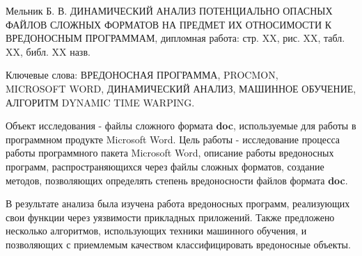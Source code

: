 
Мельник Б. В. ДИНАМИЧЕСКИЙ АНАЛИЗ ПОТЕНЦИАЛЬНО ОПАСНЫХ ФАЙЛОВ СЛОЖНЫХ ФОРМАТОВ НА ПРЕДМЕТ ИХ ОТНОСИМОСТИ К ВРЕДОНОСНЫМ ПРОГРАММАМ, дипломная работа: стр. XX, рис. XX, табл. XX, библ. XX назв.

Ключевые слова: ВРЕДОНОСНАЯ ПРОГРАММА, PROCMON, \\MICROSOFT WORD, ДИНАМИЧЕСКИЙ АНАЛИЗ, МАШИННОЕ ОБУЧЕНИЕ, АЛГОРИТМ DYNAMIC TIME WARPING.

Объект исследования - файлы сложного формата \textbf{doc}, используемые для работы в программном продукте Microsoft Word.
Цель работы - исследование процесса работы программного пакета Microsoft Word, описание работы вредоносных программ, распространяющихся через файлы сложных форматов, создание методов, позволяющих определять степень вредоносности файлов формата \textbf{doc}.

В результате анализа была изучена работа вредоносных программ, реализующих свои функции через уязвимости прикладных приложений.
Также предложено несколько алгоритмов, использующих техники машинного обучения, и позволяющих с приемлемым качеством классифицировать вредоносные объекты.